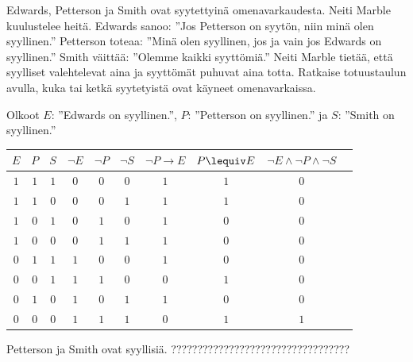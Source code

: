 \begin{tehtava}
     Edwards, Petterson ja Smith ovat syytettyinä omenavarkaudesta. Neiti Marble kuulustelee heitä. Edwards sanoo: ''Jos Petterson on syytön, niin minä olen syyllinen.'' Petterson toteaa: ''Minä olen syyllinen, jos ja vain jos Edwards on syyllinen.'' Smith väittää: ''Olemme kaikki syyttömiä.'' Neiti Marble tietää, että syylliset valehtelevat aina ja syyttömät puhuvat aina totta. Ratkaise totuustaulun avulla, kuka tai ketkä syytetyistä ovat käyneet omenavarkaissa.
    \begin{vastaus}
    Olkoot $E$: ''Edwards on syyllinen.'', $P$: ''Petterson on syyllinen.'' ja $S$: ''Smith on syyllinen.''
            \begin{center}
		    \begin{tabular}{|c|c|c|c|c|c|c|c|c|c|}\hline
		    $E$ & $P$ & $S$ & $\lnot E$ & $\lnot P$ & $\lnot S$ & $\lnot P\to E$ & $P\lequiv E$ & $\lnot E\land \lnot P \land \lnot S$ \\ \hline
		    $1$ & $1$ & $1$ & $0$ & $0$ & $0$ & $1$ & $1$ & $0$ \\ %
		    $1$ & $1$ & $0$ & $0$ & $0$ & $1$ & $1$ & $1$ & $0$ \\
		    $1$ & $0$ & $1$ & $0$ & $1$ & $0$ & $1$ & $0$ & $0$ \\
		    $1$ & $0$ & $0$ & $0$ & $1$ & $1$ & $1$ & $0$ & $0$ \\
		    $0$ & $1$ & $1$ & $1$ & $0$ & $0$ & $1$ & $0$ & $0$ \\
		    $0$ & $0$ & $1$ & $1$ & $1$ & $0$ & $0$ & $1$ & $0$ \\
		    $0$ & $1$ & $0$ & $1$ & $0$ & $1$ & $1$ & $0$ & $0$ \\
		    $0$ & $0$ & $0$ & $1$ & $1$ & $1$ & $0$ & $1$ & $1$ \\ \hline
\end{tabular}
\end{center}
    Petterson ja Smith ovat syyllisiä. ?????????????????????????????????? %
    \end{vastaus}
    
\end{tehtava}

